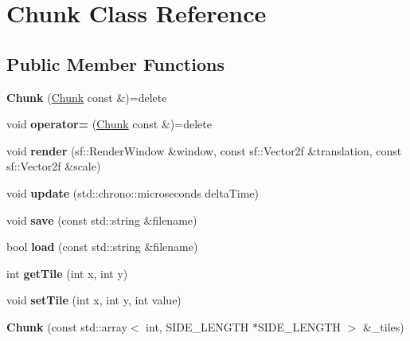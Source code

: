 \hypertarget{classChunk}{\section{Chunk Class Reference}
\label{classChunk}
}
\subsection*{Public Member Functions}
\begin{DoxyCompactItemize}
\item 
\hypertarget{classChunk_a698770d828a0a5b98250ce52a8576f4c}{{\bfseries Chunk} (\hyperlink{classChunk}{Chunk} const \&)=delete}\label{classChunk_a698770d828a0a5b98250ce52a8576f4c}

\item 
\hypertarget{classChunk_a739049c7e4b9e6b8d501ff9959e73cee}{void {\bfseries operator=} (\hyperlink{classChunk}{Chunk} const \&)=delete}\label{classChunk_a739049c7e4b9e6b8d501ff9959e73cee}

\item 
\hypertarget{classChunk_a0353e35c14d4f576542660bb762db51f}{void {\bfseries render} (sf\-::\-Render\-Window \&window, const sf\-::\-Vector2f \&translation, const sf\-::\-Vector2f \&scale)}\label{classChunk_a0353e35c14d4f576542660bb762db51f}

\item 
\hypertarget{classChunk_aa794fcda8fe859680cbfe4a2bcd5d097}{void {\bfseries update} (std\-::chrono\-::microseconds delta\-Time)}\label{classChunk_aa794fcda8fe859680cbfe4a2bcd5d097}

\item 
\hypertarget{classChunk_ac3e70286e057eb0f93accec639047097}{void {\bfseries save} (const std\-::string \&filename)}\label{classChunk_ac3e70286e057eb0f93accec639047097}

\item 
\hypertarget{classChunk_afa9fe7d9713cbf4fbe75520dd760880a}{bool {\bfseries load} (const std\-::string \&filename)}\label{classChunk_afa9fe7d9713cbf4fbe75520dd760880a}

\item 
\hypertarget{classChunk_a0e4673d23721ffed257c11499179a4b3}{int {\bfseries get\-Tile} (int x, int y)}\label{classChunk_a0e4673d23721ffed257c11499179a4b3}

\item 
\hypertarget{classChunk_a2027949ed92132d341f4e7c778ce9ebd}{void {\bfseries set\-Tile} (int x, int y, int value)}\label{classChunk_a2027949ed92132d341f4e7c778ce9ebd}

\item 
\hypertarget{classChunk_a140f2fc8f419f8f5f6cf5483abbb365a}{{\bfseries Chunk} (const std\-::array$<$ int, S\-I\-D\-E\-\_\-\-L\-E\-N\-G\-T\-H $\ast$S\-I\-D\-E\-\_\-\-L\-E\-N\-G\-T\-H $>$ \&\-\_\-tiles)}\label{classChunk_a140f2fc8f419f8f5f6cf5483abbb365a}

\end{DoxyCompactItemize}
